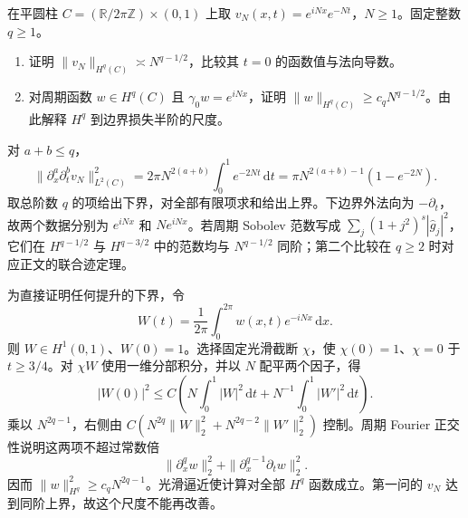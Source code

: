 \begin{exercise}\label{g3:ex:half-order-trace-scaling}
	在平圆柱 \(C=(\mathbb R/2\pi\mathbb Z)\times(0,1)\) 上取
	\(v_N(x,t)=e^{iNx}e^{-Nt}\)，\(N\ge1\)。固定整数 \(q\ge1\)。
	\begin{enumerate}
		\item 证明 \(\|v_N\|_{H^q(C)}\asymp N^{q-1/2}\)，比较其 \(t=0\) 的函数值与法向导数。
		\item 对周期函数 \(w\in H^q(C)\) 且 \(\gamma_0w=e^{iNx}\)，证明
		\(\|w\|_{H^q(C)}\ge c_qN^{q-1/2}\)。由此解释 \(H^q\) 到边界损失半阶的尺度。
	\end{enumerate}
\end{exercise}
\begin{solution}
	对 \(a+b\le q\)，
	\[
	\|\partial_x^a\partial_t^bv_N\|_{L^2(C)}^2
	=2\pi N^{2(a+b)}\int_0^1e^{-2Nt}\,\mathrm dt
	=\pi N^{2(a+b)-1}(1-e^{-2N}).
	\]
	取总阶数 \(q\) 的项给出下界，对全部有限项求和给出上界。下边界外法向为 \(-\partial_t\)，故两个数据分别为
	\(e^{iNx}\) 和 \(Ne^{iNx}\)。若周期 Sobolev 范数写成
	\(\sum_j(1+j^2)^s|\widehat g_j|^2\)，它们在
	\(H^{q-1/2}\) 与 \(H^{q-3/2}\) 中的范数均与 \(N^{q-1/2}\) 同阶；第二个比较在 \(q\ge2\) 时对应正文的联合迹定理。

	为直接证明任何提升的下界，令
	\[
	W(t)=\frac1{2\pi}\int_0^{2\pi}w(x,t)e^{-iNx}\,\mathrm dx.
	\]
	则 \(W\in H^1(0,1)\)、\(W(0)=1\)。选择固定光滑截断 \(\chi\)，使 \(\chi(0)=1\)、\(\chi=0\) 于 \(t\ge3/4\)。对 \(\chi W\) 使用一维分部积分，并以 \(N\) 配平两个因子，得
	\[
	|W(0)|^2
	\le C\left(N\int_0^1|W|^2\,\mathrm dt
																+N^{-1}\int_0^1|W'|^2\,\mathrm dt\right).
	\]
	乘以 \(N^{2q-1}\)，右侧由
	\(C(N^{2q}\|W\|_2^2+N^{2q-2}\|W'\|_2^2)\) 控制。周期 Fourier 正交性说明这两项不超过常数倍
	\[
	\|\partial_x^qw\|_2^2+
	\|\partial_x^{q-1}\partial_tw\|_2^2.
	\]
	因而 \(\|w\|_{H^q}^2\ge c_qN^{2q-1}\)。光滑逼近使计算对全部 \(H^q\) 函数成立。第一问的 \(v_N\) 达到同阶上界，故这个尺度不能再改善。
\end{solution}

